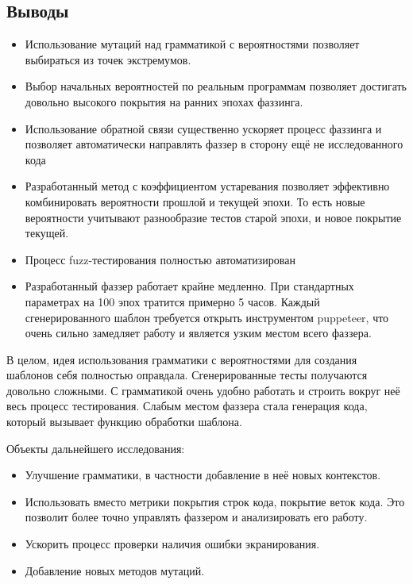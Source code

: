 \documentclass[a4paper]{article}
\begin{document}
 
\subsection{Выводы}

\begin{itemize}
    \item Использование мутаций над грамматикой с вероятностями позволяет выбираться из точек экстремумов.
    \item Выбор начальных вероятностей по реальным программам позволяет достигать довольно высокого покрытия на ранних эпохах фаззинга.
    \item Использование обратной связи существенно ускоряет процесс фаззинга и позволяет автоматически направлять фаззер в сторону ещё не исследованного кода
    \item Разработанный метод с коэффициентом устаревания позволяет эффективно комбинировать вероятности прошлой и текущей эпохи. То есть новые вероятности учитывают разнообразие тестов старой эпохи, и новое покрытие текущей.
    \item Процесс fuzz-тестирования полностью автоматизирован
    \item Разработанный фаззер работает крайне медленно. При стандартных параметрах на 100 эпох тратится примерно 5 часов. Каждый сгенерированного шаблон требуется открыть инструментом puppeteer, что очень сильно замедляет работу и является узким местом всего фаззера.
\end{itemize}
В целом, идея использования грамматики с вероятностями для создания шаблонов себя полностью оправдала. Сгенерированные тесты получаются довольно сложными. С грамматикой очень удобно работать и строить вокруг неё весь процесс тестирования. Слабым местом фаззера стала генерация кода, который вызывает функцию обработки шаблона. 

Объекты дальнейшего исследования:

\begin{itemize}
    \item Улучшение грамматики, в частности добавление в неё новых контекстов.
    \item Использовать вместо метрики покрытия строк кода, покрытие веток кода. Это позволит более точно управлять фаззером и анализировать его работу.
    \item Ускорить процесс проверки наличия ошибки экранирования.
    \item Добавление новых методов мутаций.
\end{itemize}
\end{document}
